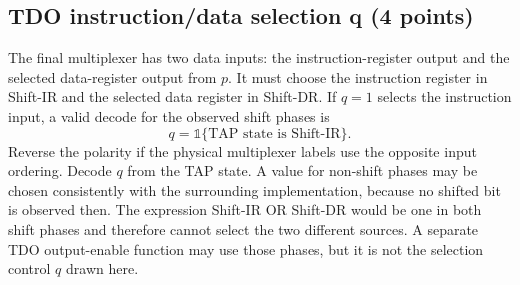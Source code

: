 \subsection{TDO instruction/data selection q (4 points)}
\answer The final multiplexer has two data inputs: the instruction-register output and the selected data-register output from $p$. It must choose the instruction register in Shift-IR and the selected data register in Shift-DR. If $q=1$ selects the instruction input, a valid decode for the observed shift phases is
\[
q=\mathbb{1}\{\text{TAP state is Shift-IR}\}.
\]
Reverse the polarity if the physical multiplexer labels use the opposite input ordering. Decode $q$ from the TAP state. A value for non-shift phases may be chosen consistently with the surrounding implementation, because no shifted bit is observed then. The expression Shift-IR OR Shift-DR would be one in both shift phases and therefore cannot select the two different sources. A separate TDO output-enable function may use those phases, but it is not the selection control $q$ drawn here.

